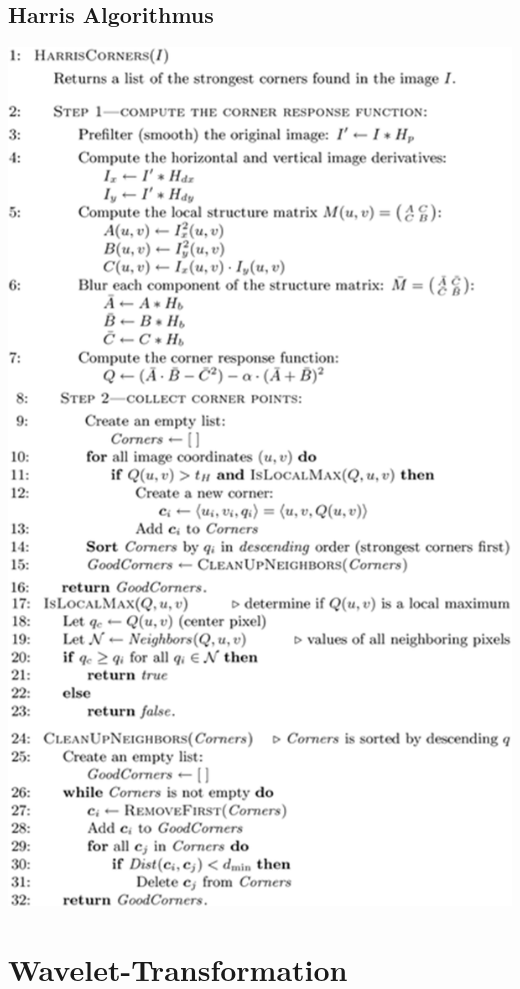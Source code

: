 \documentclass[10pt]{article}
\begin{document}
\subsection{Harris Algorithmus}
\begin{center}
	\includegraphics[scale=0.5]{harris.png}
\end{center}

\pagebreak
\section{Wavelet-Transformation}
\end{document}
